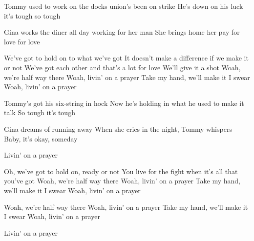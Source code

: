 \begin{verse*}
Tommy used to work on the docks
union's been on strike
He's down on his luck
it's tough
so tough
\end{verse*}

\begin{verse*}
Gina works the diner all day
working for her man
She brings home her pay
for love
for love
\end{verse*}

\begin{chorus}
We've got to hold on to what we've got
It doesn't make a difference if we make it or not
We've got each other and that's a lot for love
We'll give it a shot
Woah, we're half way there
Woah, livin' on a prayer
Take my hand, we'll make it I swear
Woah, livin' on a prayer
\end{chorus}

\begin{verse*}
Tommy's got his six-string in hock
Now he's holding in
what he used to make it talk
So tough
it's tough
\end{verse*}

\begin{verse*}
Gina dreams of running away
When she cries in the night,
Tommy whispers
Baby, it's okay,
someday
\end{verse*}

\thechorus

\begin{verse*}
Livin' on a prayer
\end{verse*}

\begin{verse*}
Oh, we've got to hold on, ready or not
You live for the fight when it's all that you've got
Woah, we're half way there
Woah, livin' on a prayer
Take my hand, we'll make it I swear
Woah, livin' on a prayer
\end{verse*}

\begin{verse*}
Woah, we're half way there
Woah, livin' on a prayer
Take my hand, we'll make it I swear
Woah, livin' on a prayer
\end{verse*}

\begin{verse*}
Livin' on a prayer
\end{verse*}
